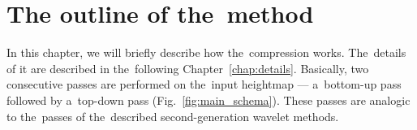 \chapter{The outline of the~method}\label{chap:outline}

\newcommand{\objnorm}[2]{\mathbold{#1_{#2}}}
\newcommand{\objdot}[2]{\mathbold{#1_{#2}^\bullet}}
\newcommand{\lnorm}[1]{\objnorm{L}{#1}}
\newcommand{\ldot}[1]{\mathbold{L_{#1}^\bullet}}

\newcommand{\opnorm}[2]{\mathit{#1_{#2}}}
\newcommand{\dnorm}{\opnorm{Q}{D}}

In this chapter, we will briefly describe how the~compression works. The~details of it are described in the~following Chapter~\ref{chap:details}. Basically, two consecutive passes are performed on the~input heightmap --- a~bottom-up pass followed by a~top-down pass (Fig.~\ref{fig:main_schema}). These passes are analogic to the~passes of the~described second-generation wavelet methods. 
	
